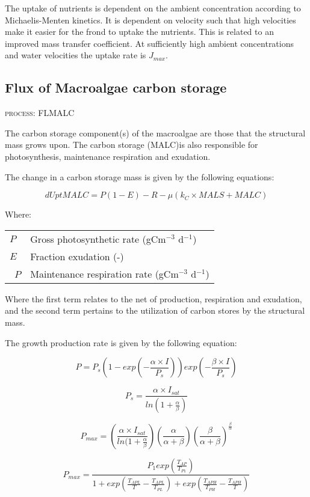 \documentclass{deltares_manual}
\begin{document}
The uptake of nutrients is dependent on the ambient concentration according to Michaelis-Menten kinetics. It is dependent on velocity such that high velocities make it easier for the frond to uptake the nutrients. This is related to an improved mass transfer coefficient. At sufficiently high ambient concentrations and water velocities the uptake rate is $J_{max}$.

\subsection{Flux of Macroalgae carbon storage}
\begin{flushright}
\textsc{process: FLMALC}
\end{flushright}

The carbon storage component(s) of the macroalgae are those that the structural mass grows upon. The carbon storage (MALC)is also responsible for photosynthesis, maintenance respiration and exudation. 

The change in a carbon storage mass is given by the following equations:

\[dUptMALC = P(1-E)-R - \mu(k_C \times MALS + MALC)\]

Where:
\begin{tabular}{ll}
$P$ & Gross photosynthetic rate (gCm$^{-3}$ d$^{-1}$)\\
$E$ & Fraction exudation (-)\\\
$P$ & Maintenance respiration rate (gCm$^{-3}$ d$^{-1}$)\\
\end{tabular}

Where the first term relates to the net of production, respiration and exudation, and the second term pertains to the utilization of carbon stores by the structural mass.

The growth production rate is given by the following equation:

\[P = P_s(1-exp(-\frac{\alpha \times I}{P_s}))exp(-\frac{\beta \times I}{P_s})\]

\[P_s = \frac{\alpha \times I_{sat}}{ln(1+\frac{\alpha}{\beta})}\]

\[P_{max} = (\frac{\alpha \times I_{sat}}{ln(1+\frac{\alpha}{\beta}})(\frac{\alpha}{\alpha+\beta})(\frac{\beta}{\alpha+\beta})^{\frac{\beta}{\alpha}}\]

\[P_{max} = \frac{P_1exp(\frac{T_{AP}}{T_{P1}})}{1+exp(\frac{T_{APL}}{T} - \frac{T_{APL}}{T_{PL}})+exp(\frac{T_{APH}}{T_{PH}}-\frac{T_{APH}}{T})}\]
\end{document}
